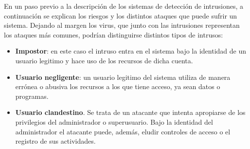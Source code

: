 En un paso previo a la descripción de los sistemas de detección de intrusiones, a continuación se explican los riesgos y los distintos ataques que puede sufrir un sistema. Dejando al margen los virus, que junto con las intrusiones representan los ataques más comunes, podrían distinguirse distintos tipos de intrusos\cite{Stallings2016}:
\begin{itemize}
	\item \textbf{Impostor}: en este caso el intruso entra en el sistema bajo la identidad de un usuario legitimo y hace uso de los recursos de dicha cuenta.
	\item \textbf{Usuario negligente}: un usuario legitimo del sistema utiliza de manera errónea o abusiva los recursos a los que tiene acceso, ya sean datos o programas.
	\item \textbf{Usuario clandestino}. Se trata de un atacante que intenta apropiarse de los privilegios del administrador o superusuario. Bajo la identidad del administrador el atacante puede, además, eludir controles de acceso o el registro de sus actividades.
\end{itemize}
